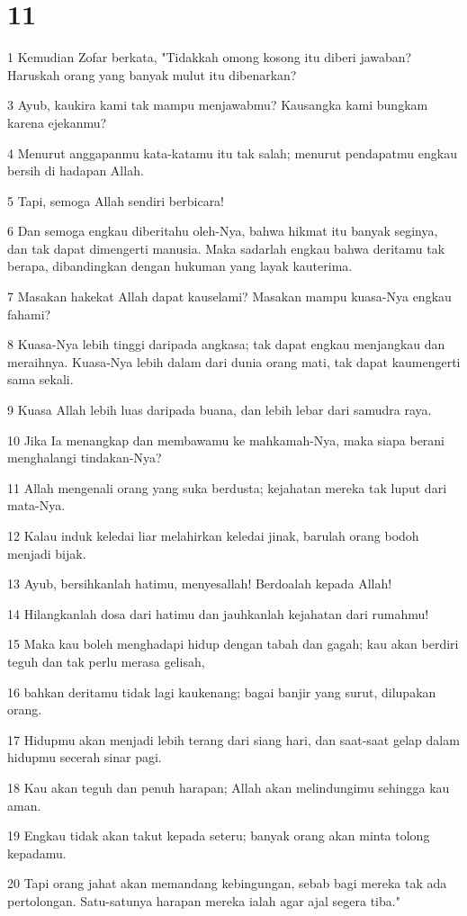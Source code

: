 \chapter{11}

\par 1 Kemudian Zofar berkata, "Tidakkah omong kosong itu diberi jawaban? Haruskah orang yang banyak mulut itu dibenarkan?
\par 3 Ayub, kaukira kami tak mampu menjawabmu? Kausangka kami bungkam karena ejekanmu?
\par 4 Menurut anggapanmu kata-katamu itu tak salah; menurut pendapatmu engkau bersih di hadapan Allah.
\par 5 Tapi, semoga Allah sendiri berbicara!
\par 6 Dan semoga engkau diberitahu oleh-Nya, bahwa hikmat itu banyak seginya, dan tak dapat dimengerti manusia. Maka sadarlah engkau bahwa deritamu tak berapa, dibandingkan dengan hukuman yang layak kauterima.
\par 7 Masakan hakekat Allah dapat kauselami? Masakan mampu kuasa-Nya engkau fahami?
\par 8 Kuasa-Nya lebih tinggi daripada angkasa; tak dapat engkau menjangkau dan meraihnya. Kuasa-Nya lebih dalam dari dunia orang mati, tak dapat kaumengerti sama sekali.
\par 9 Kuasa Allah lebih luas daripada buana, dan lebih lebar dari samudra raya.
\par 10 Jika Ia menangkap dan membawamu ke mahkamah-Nya, maka siapa berani menghalangi tindakan-Nya?
\par 11 Allah mengenali orang yang suka berdusta; kejahatan mereka tak luput dari mata-Nya.
\par 12 Kalau induk keledai liar melahirkan keledai jinak, barulah orang bodoh menjadi bijak.
\par 13 Ayub, bersihkanlah hatimu, menyesallah! Berdoalah kepada Allah!
\par 14 Hilangkanlah dosa dari hatimu dan jauhkanlah kejahatan dari rumahmu!
\par 15 Maka kau boleh menghadapi hidup dengan tabah dan gagah; kau akan berdiri teguh dan tak perlu merasa gelisah,
\par 16 bahkan deritamu tidak lagi kaukenang; bagai banjir yang surut, dilupakan orang.
\par 17 Hidupmu akan menjadi lebih terang dari siang hari, dan saat-saat gelap dalam hidupmu secerah sinar pagi.
\par 18 Kau akan teguh dan penuh harapan; Allah akan melindungimu sehingga kau aman.
\par 19 Engkau tidak akan takut kepada seteru; banyak orang akan minta tolong kepadamu.
\par 20 Tapi orang jahat akan memandang kebingungan, sebab bagi mereka tak ada pertolongan. Satu-satunya harapan mereka ialah agar ajal segera tiba."


